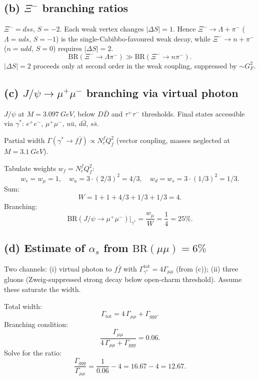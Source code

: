 \documentclass[11pt]{article}
\begin{document}
\subsection*{(b) $\Xi^-$ branching ratios}

$\Xi^-=dss$, $S=-2$. Each weak vertex changes $|\Delta S|=1$. Hence $\Xi^-\to\Lambda+\pi^-$ ($\Lambda=uds$, $S=-1$) is the single-Cabibbo-favoured weak decay, while $\Xi^-\to n+\pi^-$ ($n=udd$, $S=0$) requires $|\Delta S|=2$.
\[
\boxed{\;\text{BR}(\Xi^-\!\to\Lambda\pi^-) \gg \text{BR}(\Xi^-\!\to n\pi^-).\;}
\]
$|\Delta S|=2$ proceeds only at second order in the weak coupling, suppressed by $\sim G_F^2$.

\subsection*{(c) $J/\psi\to\mu^+\mu^-$ branching via virtual photon}

$J/\psi$ at $M=\SI{3.097}{GeV}$, below $D\bar D$ and $\tau^+\tau^-$ thresholds. Final states accessible via $\gamma^*$: $e^+e^-$, $\mu^+\mu^-$, $u\bar u$, $d\bar d$, $s\bar s$.

Partial width $\Gamma(\gamma^*\to f\bar f)\propto N_c^f Q_f^2$ (vector coupling, masses neglected at $M=\SI{3.1}{GeV}$).

Tabulate weights $w_f = N_c^f Q_f^2$:
\[
w_e = w_\mu = 1,\quad w_u = 3\cdot(2/3)^2 = 4/3,\quad w_d = w_s = 3\cdot(1/3)^2 = 1/3.
\]
Sum:
\[
W = 1+1+4/3+1/3+1/3 = 4.
\]
Branching:
\[
\boxed{\;\text{BR}(J/\psi\to\mu^+\mu^-)\big|_{\gamma^*} = \frac{w_\mu}{W} = \frac{1}{4} = 25\%.\;}
\]

\subsection*{(d) Estimate of $\alpha_s$ from $\text{BR}(\mu\mu)=6\%$}

Two channels: (i) virtual photon to $f\bar f$ with $\Gamma_{\gamma^*}^\text{tot}=4\Gamma_{\mu\mu}$ (from (c)); (ii) three gluons (Zweig-suppressed strong decay below open-charm threshold). Assume these saturate the width.

Total width:
\[
\Gamma_\text{tot} = 4\,\Gamma_{\mu\mu} + \Gamma_{ggg}.
\]
Branching condition:
\[
\frac{\Gamma_{\mu\mu}}{4\,\Gamma_{\mu\mu}+\Gamma_{ggg}} = 0.06.
\]
Solve for the ratio:
\[
\frac{\Gamma_{ggg}}{\Gamma_{\mu\mu}} = \frac{1}{0.06}-4 = 16.67-4 = 12.67.
\]
\end{document}
